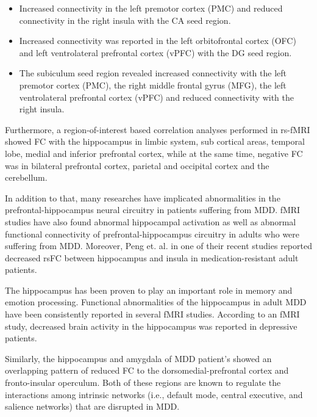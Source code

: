 \documentclass{article}
\begin{document}
\begin{itemize}

    \item Increased connectivity in the left premotor cortex (PMC) and
        reduced connectivity in the right insula with the CA seed
        region.

    \item Increased connectivity was reported in the left
        orbitofrontal cortex (OFC) and left ventrolateral prefrontal
        cortex (vPFC) with the DG seed region.

    \item The subiculum seed region revealed increased connectivity
        with the left premotor cortex (PMC), the right middle frontal
        gyrus (MFG), the left ventrolateral prefrontal cortex (vPFC)
        and reduced connectivity with the right insula.

\end{itemize}

Furthermore, a region-of-interest based correlation analyses performed
in rs-fMRI showed FC with the hippocampus in limbic system, sub
cortical areas, temporal lobe, medial and inferior prefrontal cortex,
while at the same time, negative FC was in bilateral prefrontal
cortex, parietal and occipital cortex and the cerebellum.

\enlargethispage{\baselineskip}
In addition to that, many researches have implicated abnormalities in
the prefrontal-hippocampus neural circuitry in patients suffering from
MDD. fMRI studies have also found abnormal hippocampal activation as
well as abnormal functional connectivity of prefrontal-hippocampus
circuitry in adults who were suffering from MDD. Moreover, Peng et.
al. in one of their recent studies reported decreased rsFC between
hippocampus and insula in medication-resistant adult patients.

The hippocampus has been proven to play an important role in memory
and emotion processing. Functional abnormalities of the hippocampus in
adult MDD have been consistently reported in several fMRI studies.
According to an fMRI study, decreased brain activity in the
hippocampus was reported in depressive patients.

Similarly, the hippocampus and amygdala of MDD patient’s showed an
overlapping pattern of reduced FC to the dorsomedial-prefrontal cortex
and fronto-insular operculum. Both of these regions are known to
regulate the interactions among intrinsic networks (i.e., default
mode, central executive, and salience networks) that are disrupted in
MDD.
\end{document}
